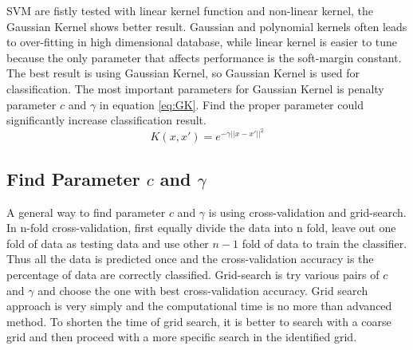 \newline
SVM are fistly tested with linear kernel function and non-linear kernel, the Gaussian Kernel shows better result. Gaussian and polynomial kernels often leads to over-fitting in high dimensional database, while linear kernel is easier to tune because the only parameter that affects performance is the soft-margin constant\cite{ben2010user}. The best result is using Gaussian Kernel, so Gaussian Kernel is used for classification. The most important parameters for Gaussian Kernel is  penalty parameter $c$ and $\gamma$ in equation \ref{eq:GK}. Find the proper parameter could significantly increase classification result.\begin{equation}
K(x,x') = e^{-\gamma||x-x'||^{2}}
\label{eq:GK}
\end{equation}
\subsection{Find Parameter $c$ and $\gamma$}
A general way to find parameter $c$ and $\gamma$ is using cross-validation and grid-search. In n-fold cross-validation, first equally divide the data into n fold, leave out one fold of data as testing data and use other $n-1$ fold of data to train the classifier. Thus all the data is predicted once and the cross-validation accuracy is the percentage of data are correctly classified. 
Grid-search is try various pairs of $c$ and $\gamma$ and choose the one with best cross-validation accuracy. Grid search approach is very simply and the computational time is no more than advanced method. To shorten the time of grid search, it is better to search with a coarse grid and then proceed with a more specific search in the identified grid.
